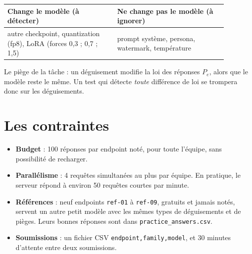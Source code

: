 \documentclass[11pt,a4paper]{report}
\theoremstyle{definition}
\theoremstyle{plain}
\newcommand{\code}[1]{\texttt{#1}}
\begin{document}
\begin{retenir}
\begin{center}
\begin{tabular}{p{0.44\linewidth}p{0.44\linewidth}}
\toprule
\textbf{Change le modèle} (à détecter) & \textbf{Ne change pas le modèle} (à ignorer) \\
\midrule
autre checkpoint, quantization (fp8), LoRA (forces 0,3 ; 0,7 ; 1,5) & prompt système, persona, watermark, température \\
\bottomrule
\end{tabular}
\end{center}
Le piège de la tâche : un déguisement modifie la loi des réponses $P_e$, alors que le modèle reste le même. Un test qui détecte \emph{toute} différence de loi se trompera donc sur les déguisements.
\end{retenir}

\section{Les contraintes}

\begin{itemize}
  \item \textbf{Budget} : 100 réponses par endpoint noté, pour toute l'équipe, sans possibilité de recharger.
  \item \textbf{Parallélisme} : 4 requêtes simultanées au plus par équipe. En pratique, le serveur répond à environ 50 requêtes courtes par minute.
  \item \textbf{Références} : neuf endpoints \code{ref-01} à \code{ref-09}, gratuits et jamais notés, servent un autre petit modèle avec les mêmes types de déguisements et de pièges. Leurs bonnes réponses sont dans \code{practice\_answers.csv}.
  \item \textbf{Soumissions} : un fichier CSV \code{endpoint,family,model}, et 30 minutes d'attente entre deux soumissions.
\end{itemize}
\end{document}
